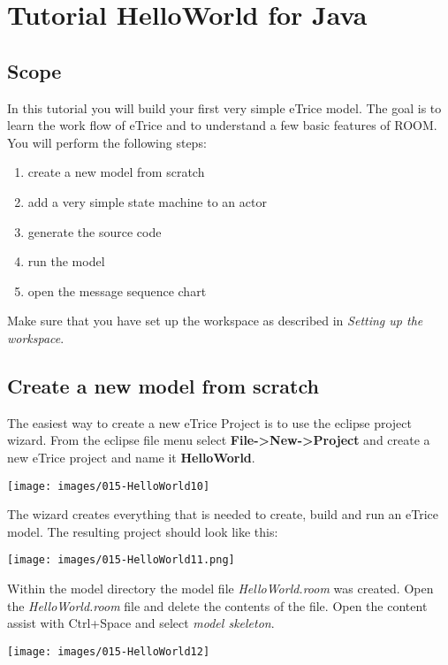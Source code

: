 \chapter{Tutorial HelloWorld for Java}

\section{Scope}

In this tutorial you will build your first very simple eTrice model. The goal is to learn the work flow of eTrice and to understand a few basic features of ROOM. You will perform the following steps:

\begin{enumerate}
\item create a new model from scratch
\item add a very simple state machine to an actor
\item generate the source code
\item run the model
\item open the message sequence chart
\end{enumerate}

Make sure that you have set up the workspace as described in \textit{Setting up the workspace}.

\section{Create a new model from scratch}

The easiest way to create a new eTrice Project is to use the eclipse project wizard. From the eclipse file menu select \textbf{File->New->Project} and create a new eTrice project and name it \textbf{HelloWorld}.

\texttt{[image: images/015-HelloWorld10]}

The wizard creates everything that is needed to create, build and run an eTrice model. The resulting project should look like this:

\texttt{[image: images/015-HelloWorld11.png]}

Within the model directory the model file \textit{HelloWorld.room} was created. Open the \textit{HelloWorld.room} file and delete the contents of the file. Open the content assist with Ctrl+Space and select \textit{model skeleton}.

\texttt{[image: images/015-HelloWorld12]}

